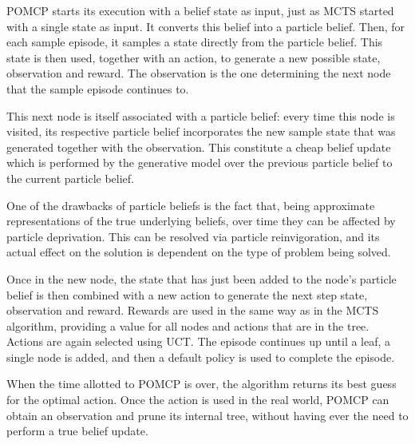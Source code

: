 POMCP starts its execution with a belief state as input, just as MCTS started with a single state as
input. It converts this belief into a particle belief. Then, for each sample episode, it samples a
state directly from the particle belief. This state is then used, together with an action, to
generate a new possible state, observation and reward. The observation is the one determining the
next node that the sample episode continues to.

This next node is itself associated with a particle belief: every time this node is visited, its
respective particle belief incorporates the new sample state that was generated together with the
observation. This constitute a cheap belief update which is performed by the generative model over
the previous particle belief to the current particle belief.

One of the drawbacks of particle beliefs is the fact that, being approximate representations of the
true underlying beliefs, over time they can be affected by particle deprivation. This can be
resolved via particle reinvigoration, and its actual effect on the solution is dependent on the type
of problem being solved.

Once in the new node, the state that has just been added to the node's particle belief is then
combined with a new action to generate the next step state, observation and reward. Rewards are used
in the same way as in the MCTS algorithm, providing a value for all nodes and actions that are in
the tree. Actions are again selected using UCT. The episode continues up until a leaf, a single node
is added, and then a default policy is used to complete the episode.

When the time allotted to POMCP is over, the algorithm returns its best guess for the optimal
action. Once the action is used in the real world, POMCP can obtain an observation and prune its
internal tree, without having ever the need to perform a true belief update.
